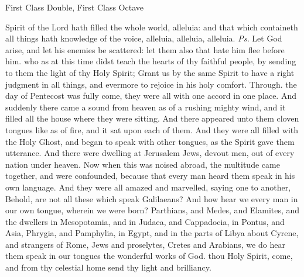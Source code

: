 \begin{inhead}
    {First Class Double, First Class Octave}
\end{inhead}
\par\noindent
{}



\properantiphonfix

\introit
{} Spirit of the Lord hath filled the whole world, alleluia: and that which containeth all things hath knowledge of the voice, alleluia, alleluia, alleluia. \textit{Ps.} Let God arise, and let his enemies be scattered: let them also that hate him flee before him.
\collect
{} who as at this time didst teach the hearts of thy faithful people, by sending to them the light of thy Holy Spirit; Grant us by the same Spirit to have a right judgment in all things, and evermore to rejoice in his holy comfort. Through.
 the day of Pentecost was fully come, they were all with one accord in one place. And suddenly there came a sound from heaven as of a rushing mighty wind, and it filled all the house where they were sitting. And there appeared unto them cloven tongues like as of fire, and it sat upon each of them. And they were all filled with the Holy Ghost, and began to speak with other tongues, as the Spirit gave them utterance. And there were dwelling at Jerusalem Jews, devout men, out of every nation under heaven. Now when this was noised abroad, the multitude came together, and were confounded, because that every man heard them speak in his own language. And they were all amazed and marvelled, saying one to another, Behold, are not all these which speak Galilaeans? And how hear we every man in our own tongue, wherein we were born? Parthians, and Medes, and Elamites, and the dwellers in Mesopotamia, and in Judaea, and Cappadocia, in Pontus, and Asia, Phrygia, and Pamphylia, in Egypt, and in the parts of Libya about Cyrene, and strangers of Rome, Jews and proselytes, Cretes and Arabians, we do hear them speak in our tongues the wonderful works of God.
\label{WhitSeq}
 thou Holy Spirit, come, and from thy celestial home send thy light and brilliancy.

